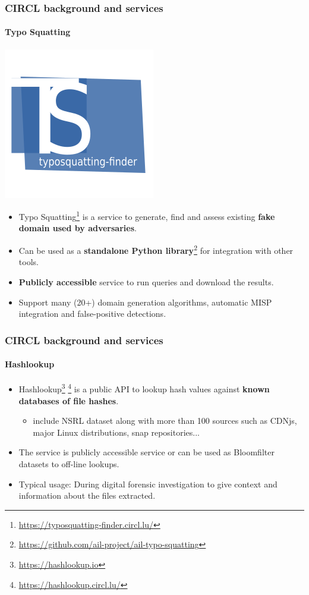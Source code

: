 \begin{frame}
    \frametitle{CIRCL background and services}
    \framesubtitle{Typo Squatting}
    \begin{center}
        \includegraphics[width=0.17\linewidth]{pictures/typosquatting-logo.png}
    \end{center}
    \begin{itemize}
        \item Typo Squatting\footnote{\url{https://typosquatting-finder.circl.lu/}} is a service to generate, find and assess existing \textbf{fake domain used by adversaries}.
        \item Can be used as a \textbf{standalone Python library}\footnote{\url{https://github.com/ail-project/ail-typo-squatting}} for integration with other tools.
        \item \textbf{Publicly accessible} service to run queries and download the results.
        \item Support many (20+) domain generation algorithms, automatic MISP integration and false-positive detections.
    \end{itemize}
\end{frame}

\begin{frame}
    \frametitle{CIRCL background and services}
    \framesubtitle{Hashlookup}
    \begin{itemize}
        \item Hashlookup\footnote{\url{https://hashlookup.io}} \footnote{\url{https://hashlookup.circl.lu/}} is a public API to lookup hash values against \textbf{known databases of file hashes}.
            \begin{itemize}
                \item include NSRL dataset along with more than 100 sources such as CDNjs, major Linux distributions, snap repositories... 
            \end{itemize}
        \item The service is publicly accessible service or can be used as Bloomfilter datasets to off-line lookups.
        \item Typical usage: During digital forensic investigation to give context and information about the files extracted. 
    \end{itemize}
\end{frame}

